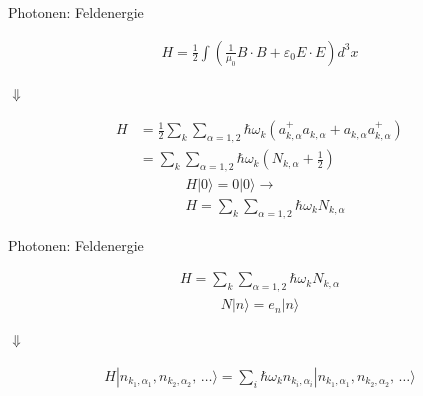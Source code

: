 \documentclass{beamer}
\begin{document}
\begin{frame}[t]{Photonen: Feldenergie}
	\vspace*{-0.5cm}
	\begin{center}
		
		\begin{minipage}{0.35\textwidth}
			\begin{align*}
			H = \frac{1}{2} \int \left(\frac{1}{\mu_0} B \cdot B + \varepsilon_0 E \cdot E \right) d^3 x
			\end{align*}
		\end{minipage}
		
		\vspace*{0.5cm}
		$\Downarrow$
		
		\begin{minipage}{0.35\textwidth}
			\begin{align*}
			H &= \frac{1}{2} \sum_k \sum_{\alpha=1,2} \hbar \omega_k \left(a^+_{k,\alpha} a_{k,\alpha} + a_{k,\alpha} a^+_{k,\alpha}\right) \\
			&= \sum_k \sum_{\alpha=1,2} \hbar \omega_k \left(N_{k,\alpha} + \frac{1}{2} \right)
			\end{align*}
			\vspace*{-0.5cm}
			\begin{align*}
			& H|0\rangle = 0|0\rangle \rightarrow \\
			& H = \sum_k \sum_{\alpha=1,2} \hbar \omega_k N_{k,\alpha}
			\end{align*}
		\end{minipage}
		
	\end{center}
\end{frame}

\begin{frame}[t]{Photonen: Feldenergie}
	\vspace*{-0.5cm}
	\begin{center}
		\begin{minipage}{0.35\textwidth}
			\begin{align*}
				H = \sum_k \sum_{\alpha=1,2} \hbar \omega_k N_{k,\alpha}
			\end{align*}
			\begin{align*}
				N|n\rangle = e_n|n\rangle
			\end{align*}
		\end{minipage}
		
		\vspace*{0.5cm}
		$\Downarrow$
		
		\begin{minipage}{0.35\textwidth}
			\begin{align*}
				H |n_{k_1,\alpha_1}, n_{k_2,\alpha_2}, \, \hdots\rangle = \sum_i \hbar \omega_k n_{k_i,\alpha_i} |n_{k_1,\alpha_1}, n_{k_2,\alpha_2}, \, \hdots\rangle
			\end{align*}
		\end{minipage}
		
	\end{center}
\end{frame}
\end{document}
